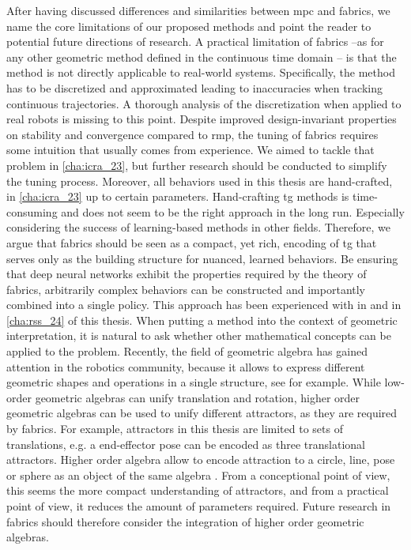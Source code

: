 After having discussed differences and similarities between
\ac{mpc} and \ac{fabrics}, we name the core limitations of
our proposed methods and point the reader to potential
future directions of research. 
A practical limitation of \ac{fabrics} --as for any other
geometric method defined in the continuous time domain --
is that the method is not directly applicable to real-world
systems. Specifically, the method has to be discretized and
approximated leading to inaccuracies when tracking continuous
trajectories. A thorough analysis of the discretization
when applied to real robots is missing to this point.
Despite improved design-invariant properties on stability
and convergence compared to \ac{rmp}, the tuning of \ac{fabrics} requires some
intuition that usually comes from experience. We aimed to
tackle that problem in \cref{cha:icra_23}, but further
research should be conducted to simplify the tuning process.
Moreover, all behaviors used in this thesis are
hand-crafted, in \cref{cha:icra_23} up to certain
parameters. Hand-crafting \ac{tg} methods is time-consuming
and does not seem to be the right approach in the long run.
Especially considering the success of learning-based methods
in other fields. Therefore, we argue that \ac{fabrics}
should be seen as a compact, yet rich, encoding of
\ac{tg} that serves only as the building structure for
nuanced, learned behaviors. Be ensuring that deep neural
networks exhibit the properties required by the theory of 
\ac{fabrics}, arbitrarily complex behaviors can be
constructed and importantly combined into a single policy.
This approach has been experienced with in \cite{xie2023neural}
and in \cref{cha:rss_24} of this thesis.
When putting a method into the context of geometric
interpretation, it is natural to ask whether other
mathematical concepts can be applied to the problem.
Recently, the field of geometric algebra has gained 
attention in the robotics community, because it allows
to express different geometric shapes and operations in a
single structure, see \cite{low2023geometric} for example.
While low-order geometric algebras can unify translation and
rotation, higher order geometric algebras can be used to unify
different attractors, as they are required by \ac{fabrics}.
For example, attractors in this thesis are limited to
sets of translations, e.g. a end-effector pose can be
encoded as three translational attractors. Higher order
algebra allow to encode attraction to a circle, line, pose
or sphere as an object of the same algebra \cite{low2023geometric}.
From a conceptional point of view, this seems the more
compact understanding of attractors, and from a practical
point of view, it reduces the amount of parameters required.
Future research in \ac{fabrics} should therefore consider
the integration of higher order geometric algebras.





